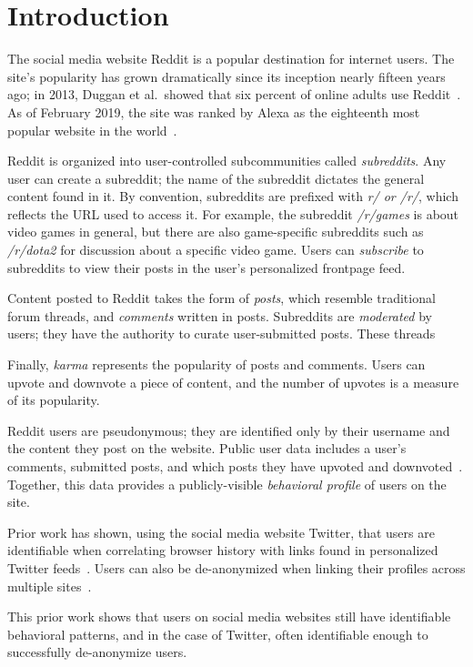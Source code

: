 \documentclass[10pt]{article}
\begin{document}
\section{Introduction}

The social media website Reddit is a popular destination for internet users. The site's popularity has grown dramatically since its inception nearly fifteen years ago; in 2013, Duggan et al.\ showed that six percent of online adults use Reddit~\cite{pewsixpercent}. As of February 2019, the site was ranked by Alexa as the eighteenth most popular website in the world~\cite{alexareddit}.

Reddit is organized into user-controlled subcommunities called \textit{subreddits}. Any user can create a subreddit; the name of the subreddit dictates the general content found in it. By convention, subreddits are prefixed with \textit{r/ or /r/}, which reflects the URL used to access it. For example, the subreddit \textit{/r/games} is about video games in general, but there are also game-specific subreddits such as \textit{/r/dota2} for discussion about a specific video game. Users can \textit{subscribe} to subreddits to view their posts in the user's personalized frontpage feed.

Content posted to Reddit takes the form of \textit{posts}, which resemble traditional forum threads, and \textit{comments} written in posts. Subreddits are \textit{moderated} by users; they have the authority to curate user-submitted posts. These threads 

Finally, \textit{karma} represents the popularity of posts and comments. Users can upvote and downvote a piece of content, and the number of upvotes is a measure of its popularity.

Reddit users are pseudonymous; they are identified only by their username and the content they post on the website. Public user data includes a user's comments, submitted posts, and which posts they have upvoted and downvoted~\cite{redditapi}. Together, this data provides a publicly-visible \textit{behavioral profile} of users on the site.

Prior work has shown, using the social media website Twitter, that users are identifiable when correlating browser history with links found in personalized Twitter feeds~\cite{su2017deanonymizingweb}. Users can also be de-anonymized when linking their profiles across multiple sites~\cite{}\cite{}.

This prior work shows that users on social media websites still have identifiable behavioral patterns, and in the case of Twitter, often identifiable enough to successfully de-anonymize users.
\end{document}
